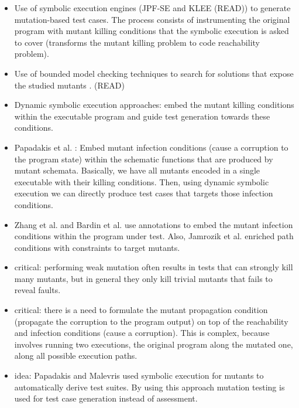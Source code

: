 \begin{itemize}
	\item Use of symbolic execution engines (JPF-SE \cite{anand2007jpf} and KLEE \cite{holling2016nequivack} (READ)) to generate mutation-based test cases. 
	The process consists of instrumenting the original program with mutant killing conditions that the symbolic execution is asked to cover (transforms the mutant killing problem to code reachability problem). 
	\item Use of bounded model checking techniques to search for solutions that expose the studied mutants \cite{riener2011test}. (READ)

	\item Dynamic symbolic execution approaches: embed the mutant killing conditions within the executable program and guide test generation towards these conditions.

	\item Papadakis et al. \cite{papadakis2011automatically, papadakis2010towards}:
	Embed mutant infection conditions (cause a corruption to the program state) within the schematic functions that are produced by mutant schemata. Basically, we have all mutants encoded in a single executable with their killing conditions. Then, using dynamic symbolic execution we can directly produce test cases that targets those infection conditions.

	\item Zhang et al. \cite{zhang2010test} and Bardin et al. \cite{papadakis2011automatically,papadakis2010towards} use annotations to embed the mutant infection conditions within the program under test. Also, Jamrozik et al. \cite{jamrozik2013generating} enriched path conditions with constraints to target mutants.

	\item critical: performing weak mutation often results in tests that can strongly kill many mutants, but in general they only kill trivial mutants that fails to reveal faults.
	
	\item critical: there is a need to formulate the mutant propagation condition (propagate the corruption to the program output) on top of the reachability and infection conditions (cause a corruption). This is complex, because involves running two executions, the original program along the mutated one, along all possible execution paths.

	\item idea: Papadakis and Malevris \cite{papadakis2010automatic} used symbolic execution for mutants to automatically derive test suites. By using this approach mutation testing is used for test case generation instead of assessment.

\end{itemize}

